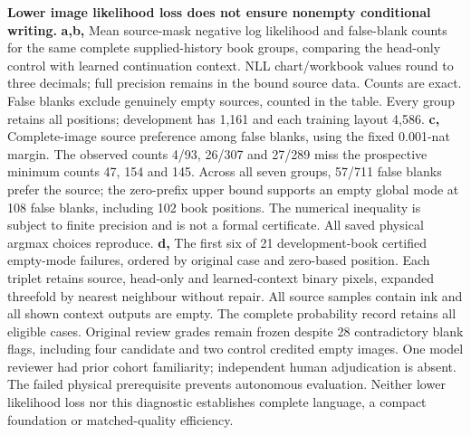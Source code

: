 \textbf{Lower image likelihood loss does not ensure nonempty conditional writing.}
\textbf{a,b,} Mean source-mask negative log likelihood and false-blank counts
for the same complete supplied-history book groups, comparing the head-only
control with learned continuation context. NLL chart/workbook values round to
three decimals; full precision remains in the bound source data. Counts are
exact. False blanks exclude genuinely empty sources, counted in the table.
Every group retains all positions; development has 1,161 and each training
layout 4,586. \textbf{c,} Complete-image source preference among false blanks,
using the fixed 0.001-nat margin. The observed counts 4/93, 26/307 and 27/289
miss the prospective minimum counts 47, 154 and 145. Across all seven groups,
57/711 false blanks prefer the source; the zero-prefix upper bound supports
an empty global mode at 108 false blanks, including 102 book positions.
The numerical inequality is subject to finite precision and is not a formal
certificate. All saved physical argmax choices reproduce.
\textbf{d,} The first six of 21 development-book certified empty-mode failures,
ordered by original case and zero-based position. Each triplet retains source,
head-only and learned-context binary pixels, expanded threefold by nearest
neighbour without repair. All source samples contain ink and all shown context
outputs are empty. The complete probability record retains all eligible cases.
Original review grades remain frozen despite 28 contradictory blank flags,
including four candidate and two control credited empty images. One model
reviewer had prior cohort familiarity; independent human adjudication is absent.
The failed physical prerequisite prevents autonomous evaluation. Neither lower
likelihood loss nor this diagnostic establishes complete language, a compact
foundation or matched-quality efficiency.

